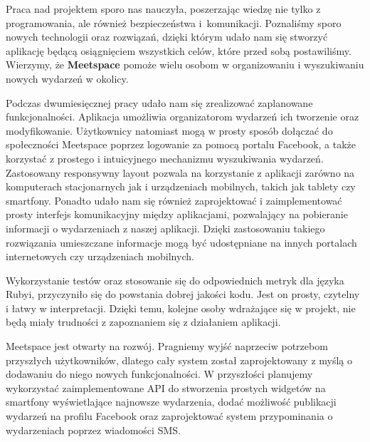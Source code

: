 Praca nad projektem sporo nas nauczyła, poszerzając wiedzę nie tylko z programowania, ale również bezpieczeństwa i~komunikacji.
Poznaliśmy sporo nowych technologii oraz rozwiązań, dzięki którym udało nam się stworzyć aplikację będącą osiągnięciem wszystkich celów, które przed sobą postawiliśmy.
Wierzymy, że \textbf{Meetspace} pomoże wielu osobom w organizowaniu i wyszukiwaniu nowych wydarzeń w okolicy.

Podczas dwumiesięcznej pracy udało nam się zrealizować zaplanowane funkcjonalności.
Aplikacja umożliwia organizatorom wydarzeń ich tworzenie oraz modyfikowanie.
Użytkownicy natomiast mogą w prosty sposób dołączać do społeczności Meetspace poprzez logowanie za pomocą portalu Facebook, a także korzystać z prostego i intuicyjnego mechanizmu wyszukiwania wydarzeń.
Zastosowany responsywny layout pozwala na korzystanie z aplikacji zarówno na komputerach stacjonarnych jak i urządzeniach mobilnych, takich jak tablety czy smartfony.
Ponadto udało nam się również zaprojektować i zaimplementować prosty interfejs komunikacyjny między aplikacjami, pozwalający na pobieranie informacji o wydarzeniach z naszej aplikacji.
Dzięki zastosowaniu takiego rozwiązania umieszczane informacje mogą być udostępniane na innych portalach internetowych czy urządzeniach mobilnych.

Wykorzystanie testów oraz stosowanie się do odpowiednich metryk dla języka Rubyi, przyczyniło się do powstania dobrej jakości kodu. Jest on prosty, czytelny i łatwy w interpretacji. Dzięki temu, kolejne osoby wdrażające się w projekt, nie będą miały trudności z zapoznaniem się z działaniem aplikacji.

Meetspace jest otwarty na rozwój. Pragniemy wyjść naprzeciw potrzebom przyszłych użytkowników, dlatego cały system został zaprojektowany z myślą o dodawaniu do niego nowych funkcjonalności.
W przyszłości planujemy wykorzystać zaimplementowane API do stworzenia prostych widgetów na smartfony wyświetlające najnowsze wydarzenia,
dodać możliwość publikacji wydarzeń na profilu Facebook oraz zaprojektować system przypominania o wydarzeniach poprzez wiadomości SMS.
